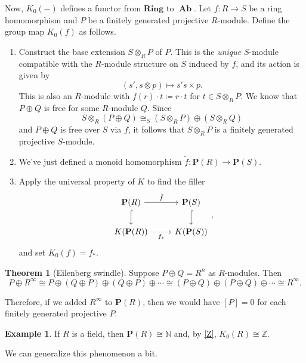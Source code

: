 \documentclass[10pt,letterpaper,cm]{nupset}
\theoremstyle{definition}
\newtheorem{exmp}[definition]{Example}
\theoremstyle{theorem}
\newtheorem{theorem}[definition]{Theorem}
\theoremstyle{remark}
\newcommand{\N}{\mathbb N}
\renewcommand{\P}{\mathbf P}
\newcommand{\Z}{\mathbb Z}
\newcommand{\1}{\mathbf{1}}
\newcommand{\0}{\vec 0}
\DeclareMathOperator{\Ab}{\mathbf{Ab}}
\begin{document}
Now, $K_0(-)$ defines a functor from $\mathbf{Ring}$ to $\Ab$. Let $f: R \to S$ be a ring homomorphism and $P$ be a finitely generated projective $R$-module. Define the group map $K_0(f)$ as follows.
\begin{enumerate}[label=(\arabic*)]
\item Construct  the base extension $S\otimes_R P$ of $P$. This is the \textit{unique} $S$-module  compatible with the $R$-module structure on $S$ induced by $f$, and its action is given by $$\left(s', s \otimes p\right) \mapsto  s's \times p.$$ This is also an $R$-module with $f(r) \cdot t \coloneqq r\cdot t$ for $t\in S \otimes_R P$. We know that $P \oplus Q$ is free for some $R$-module $Q$. Since $$S\otimes_R \left(P \oplus Q\right) \cong_S \left(S \otimes_R P\right)\oplus \left(S \otimes_R Q\right)$$ and $P\oplus Q$ is free over $S$ via $f$, it follows that  $S \otimes_R P$ is a finitely generated projective $S$-module.
\item We've just defined a monoid homomorphism $\tilde{f} : \P(R) \to \P(S)$.
\item Apply the universal property of $K$ to find the filler
\[
\begin{tikzcd}
\mathbf{P}(R) \arrow[d, hook] \arrow[r, "\tilde{f}"] & \mathbf{P}(S) \arrow[d, hook] \\
K(\mathbf{P}(R)) \arrow[r, "f_{\ast}"', dotted] & K(\mathbf{P}(S))
\end{tikzcd},
\]
and set $K_0(f) = f_{\ast}$.
\end{enumerate}

\smallskip

\begin{theorem}[Eilenberg swindle]
Suppose $P \oplus Q =R^n$ as $R$-modules. Then $$P \oplus R^{\infty} \cong P \oplus  \left(Q \oplus P\right) \oplus \left(Q \oplus P\right) \oplus \cdots \cong \left(P \oplus Q\right) \oplus \left(P \oplus Q\right) \oplus \cdots \cong R^{\infty}.$$
\end{theorem}

Therefore, if we added $R^{\infty}$ to $\P(R)$, then we would have $\left[P\right] = 0$ for each finitely generated projective $P$.

\smallskip

\begin{exmp}
If $R$ is a field, then $\P(R) \cong \N$ and, by \cref{Z}, $K_0(R) \cong \Z$. 
\end{exmp}

We can generalize this phenomenon a bit.
\end{document}
